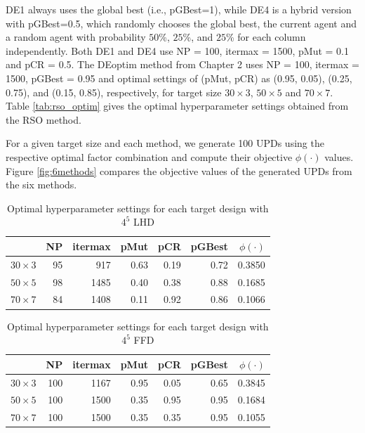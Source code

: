 \documentclass [PhD] {package/uclathes}
\begin{document}
DE1 always uses the global best (i.e., pGBest=1), while DE4 is a hybrid version with pGBest=0.5, which randomly chooses the global best, the current agent and a random agent with probability $50$\%, $25$\%, and $25$\% for each column independently. Both DE1 and DE4 use NP = 100, itermax = 1500, pMut = 0.1 and pCR = 0.5. The DEoptim method from Chapter 2 uses  NP = 100, itermax = 1500, pGBest = 0.95 and optimal settings of (pMut, pCR) as (0.95, 0.05), (0.25, 0.75), and (0.15, 0.85), respectively, for target size $30\times3$, $50\times5$ and $70\times7$. Table \ref{tab:rso_optim} gives the optimal hyperparameter settings obtained from  the RSO method.


For a given target size and each method, we generate 100 UPDs using the respective optimal factor combination and compute their objective $\phi(\cdot)$ values.  Figure \ref{fig:6methods} compares the objective values of the generated UPDs from the six methods.


\begin{table}

\caption{\label{tab:lhd_optim}Optimal hyperparameter settings for each target design with $4^5$ LHD}
\centering
\begin{tabular}[t]{l|r|r|r|r|r|r}
\hline
  & NP & itermax & pMut & pCR & pGBest & $\phi(\cdot)$\\
\hline
$30\times3$ & 95 & 917 & 0.63 & 0.19 & 0.72 & 0.3850\\
\hline
$50\times5$ & 98 & 1485 & 0.40 & 0.38 & 0.88 & 0.1685\\
\hline
$70\times7$ & 84 & 1408 & 0.11 & 0.92 & 0.86 & 0.1066\\
\hline
\end{tabular}
\end{table}\begin{table}

\caption{\label{tab:grid_optim}Optimal hyperparameter settings for each target design with $4^5$ FFD}
\centering
\begin{tabular}[t]{l|r|r|r|r|r|r}
\hline
  & NP & itermax & pMut & pCR & pGBest & $\phi(\cdot)$\\
\hline
$30\times3$ & 100 & 1167 & 0.95 & 0.05 & 0.65 & 0.3845\\
\hline
$50\times5$ & 100 & 1500 & 0.35 & 0.95 & 0.95 & 0.1684\\
\hline
$70\times7$ & 100 & 1500 & 0.35 & 0.35 & 0.95 & 0.1055\\
\hline
\end{tabular}
\end{table}
\end{document}
